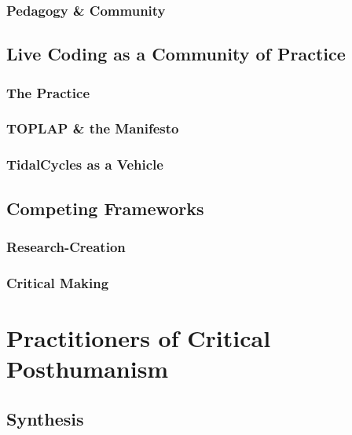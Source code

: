 \documentclass[
  american,
  12pt,
]{article}
\begin{document}
\subsubsection{Pedagogy \& Community}\label{pedagogy-community}

\subsection{Live Coding as a Community of
Practice}\label{live-coding-as-a-community-of-practice}

\subsubsection{The Practice}\label{the-practice}

\subsubsection{TOPLAP \& the Manifesto}\label{toplap-the-manifesto}

\subsubsection{TidalCycles as a Vehicle}\label{tidalcycles-as-a-vehicle}

\subsection{Competing Frameworks}\label{competing-frameworks}

\subsubsection{Research-Creation}\label{research-creation}

\subsubsection{Critical Making}\label{critical-making}

\section{Practitioners of Critical
Posthumanism}\label{practitioners-of-critical-posthumanism}

\subsection{Synthesis}\label{synthesis}
\end{document}
